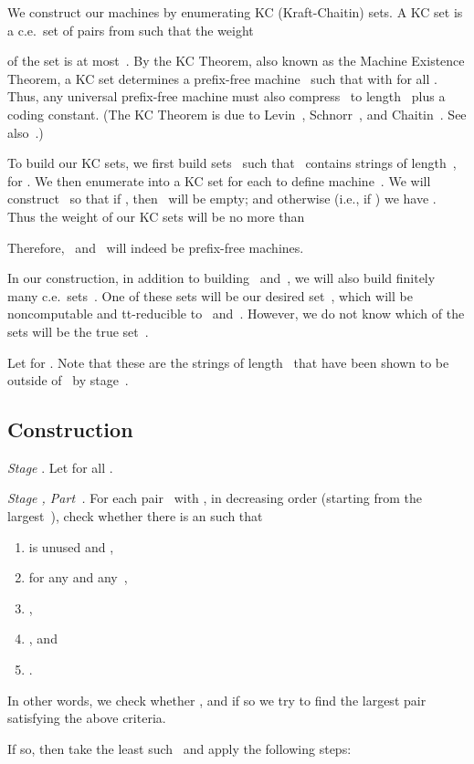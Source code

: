 \documentclass{LMCS}
\newcommand{\0}{\mathbf{0}}
\newcommand{\ce}{c.e.\ }
\newcommand{\<}{\langle}
\renewcommand{\>}{\rangle}
\begin{document}
We construct our machines by enumerating KC (Kraft-Chaitin) sets.  A KC set
is a \ce set of pairs  from
 such that the weight

of the set is at most~.  By the KC Theorem, also known as the Machine
Existence Theorem, a KC set determines a prefix-free machine~ such that
 with  for all .  Thus, any
universal prefix-free machine must also compress~ to length~
plus a coding constant.  (The KC Theorem is due to Levin~\cite{Levin},
Schnorr~\cite{Schnorr}, and Chaitin~\cite{Chaitin}.  See
also~\cite[p.~125]{Downey-Hirschfeldt}.)

To build our KC sets, we first build sets~ such that~ contains
strings of length~, for . We then enumerate  into a KC set for each  to
define machine~. We will construct~ so that if ,
then~ will be empty; and otherwise (i.e., if ) we have
. Thus the weight of our KC sets will
be no more than

Therefore,~ and~ will indeed be prefix-free machines.

In our construction, in addition to building~ and~, we will also
build finitely many \ce sets~.  One of these sets will be our desired
set~, which will be noncomputable and tt-reducible to~ and~.
However, we do not know which of the sets will be the true set~.


Let  for .  Note
that these are the strings of length~ that have been shown to be outside
of~ by stage~.


\subsection{Construction}



{\em Stage }.  Let  for all .


\medskip
{\em Stage , Part~.} For each pair~ with , in
decreasing order (starting from the largest~), check whether there is an
 such that
\begin{enumerate}[label=(\roman*)]
\item  is unused and ,
\item  for any  and any~,
\item ,
\item , and
\item .
\end{enumerate}

\noindent In other words, we check whether , and if so
we try to find the largest pair~ satisfying the above criteria.

If so, then take the least such~ and apply the following steps:
\end{document}
